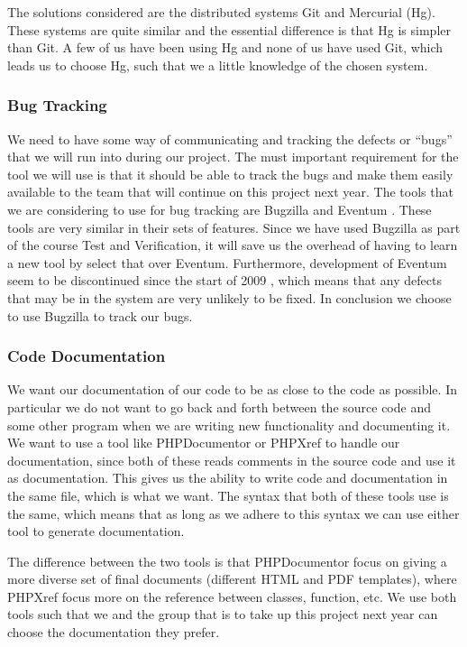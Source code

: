 The solutions considered are the distributed systems Git and Mercurial (Hg).
These systems are quite similar and the essential difference is that Hg is simpler than Git.
A few of us have been using Hg and none of us have used Git, which leads us to choose Hg, such that we a little knowledge of the chosen system.

\subsubsection{Bug Tracking}
We need to have some way of communicating and tracking the defects or ``bugs'' that we will run into during our project.
The must important requirement for the tool we will use is that it should be able to track the bugs and make them easily available to the team that will continue on this project next year.
The tools that we are considering to use for bug tracking are Bugzilla \cite{bugzillaFeat} and Eventum \cite{eventumFeat}.
These tools are very similar in their sets of features.
Since we have used Bugzilla as part of the course Test and Verification, it will save us the overhead of having to learn a new tool by select that over Eventum.
Furthermore, development of Eventum seem to be discontinued since the start of 2009 \cite{eventumDiscont}, which means that any defects that may be in the system are very unlikely to be fixed.
In conclusion we choose to use Bugzilla to track our bugs.

\subsubsection{Code Documentation}
We want our documentation of our code to be as close to the code as possible.
In particular we do not want to go back and forth between the source code and some other program when we are writing new functionality and documenting it.
We want to use a tool like PHPDocumentor \cite{phpdocumentor} or PHPXref \cite{phpxref} to handle our documentation, since both of these reads comments in the source code and use it as documentation.
This gives us the ability to write code and documentation in the same file, which is what we want.
The syntax that both of these tools use is the same, which means that as long as we adhere to this syntax we can use either tool to generate documentation.

The difference between the two tools is that PHPDocumentor focus on giving a more diverse set of final documents (different HTML and PDF templates), where PHPXref focus more on the reference between classes, function, etc.
We use both tools such that we and the group that is to take up this project next year can choose the documentation they prefer.


